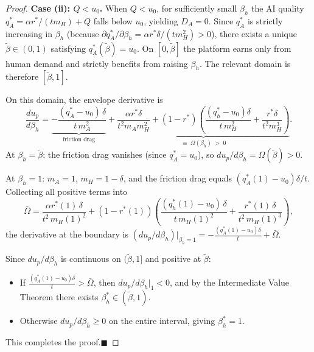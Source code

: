 \documentclass[mnsc,nonblindrev]{informs3_NoOR}
\begin{document}
\begin{proof}
\medskip\noindent\textbf{Case (ii): $Q < u_0$.}
When $Q < u_0$, for sufficiently small $\beta_h$ the AI quality $q_A^* = \alpha r^*/(tm_H) + Q$ falls below $u_0$, yielding $D_A = 0$. Since $q_A^*$ is strictly increasing in $\beta_h$ (because $\partial q_A^*/\partial \beta_h = \alpha r^* \delta/(tm_H^2) > 0$), there exists a unique $\tilde\beta \in (0,1)$ satisfying $q_A^*(\tilde\beta) = u_0$. On $[0, \tilde\beta]$ the platform earns only from human demand and strictly benefits from raising $\beta_h$. The relevant domain is therefore $[\tilde\beta, 1]$.
 
On this domain, the envelope derivative is
\[
\frac{du_p}{d\beta_h} = \underbrace{-\frac{(q_A^* - u_0)\,\delta}{t\,m_A^2}}_{\text{friction drag}} + \underbrace{\frac{\alpha r^*\delta}{t^2 m_A m_H^2} + (1-r^*)\!\left(\frac{(q_h^* - u_0)\delta}{t\,m_H^2} + \frac{r^*\delta}{t^2 m_H^3}\right)}_{\equiv\;\Omega(\beta_h)\;>\;0}.
\]
At $\beta_h = \tilde\beta$: the friction drag vanishes (since $q_A^* = u_0$), so $du_p/d\beta_h = \Omega(\tilde\beta) > 0$.
 
At $\beta_h = 1$: $m_A = 1$, $m_H = 1-\delta$, and the friction drag equals $(q_A^*(1) - u_0)\delta/t$. Collecting all positive terms into
\[
\bar\Omega = \frac{\alpha r^*(1)\,\delta}{t^2\,m_H(1)^2} + (1-r^*(1))\!\left(\frac{(q_h^*(1)-u_0)\,\delta}{t\,m_H(1)^2} + \frac{r^*(1)\,\delta}{t^2\,m_H(1)^3}\right),
\]
the derivative at the boundary is $(du_p/d\beta_h)\big|_{\beta_h=1} = -\frac{(q_A^*(1)-u_0)\delta}{t} + \bar\Omega$.
 
Since $du_p/d\beta_h$ is continuous on $(\tilde\beta, 1]$ and positive at $\tilde\beta$:
\begin{itemize}
\item If $\frac{(q_A^*(1)-u_0)\delta}{t} > \bar\Omega$, then $du_p/d\beta_h\big|_1 < 0$, and by the Intermediate Value Theorem there exists $\beta_h^* \in (\tilde\beta, 1)$.
\item Otherwise $du_p/d\beta_h \ge 0$ on the entire interval, giving $\beta_h^* = 1$.
\end{itemize}
This completes the proof.\hfill $\blacksquare$
\end{proof}
\end{document}
